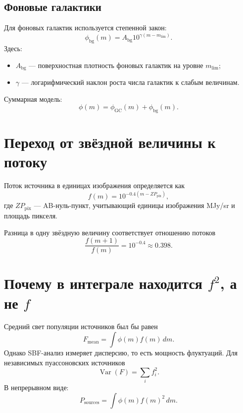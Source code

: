 \documentclass[12pt,a4paper]{article}
\newcommand{\Phigc}{\phi_{\mathrm{GC}}}
\newcommand{\Phibg}{\phi_{\mathrm{bg}}}
\begin{document}
\subsection{Фоновые галактики}

Для фоновых галактик используется степенной закон:
\begin{equation}
    \Phibg(m)=
    A_{\mathrm{bg}}
    10^{\gamma(m-m_{\mathrm{lim}})}.
\end{equation}
Здесь:
\begin{itemize}
    \item \(A_{\mathrm{bg}}\) --- поверхностная плотность
    фоновых галактик на уровне \(m_{\mathrm{lim}}\);
    \item \(\gamma\) --- логарифмический наклон роста числа
    галактик к слабым величинам.
\end{itemize}

Суммарная модель:
\begin{equation}
    \phi(m)=\Phigc(m)+\Phibg(m).
\end{equation}

\section{Переход от звёздной величины к потоку}

Поток источника в единицах изображения определяется как
\begin{equation}
    f(m)=10^{-0.4(m-ZP_{\mathrm{pix}})},
\end{equation}
где \(ZP_{\mathrm{pix}}\) --- AB-нуль-пункт, учитывающий
единицы изображения MJy/sr и площадь пикселя.

Разница в одну звёздную величину соответствует отношению
потоков
\begin{equation}
    \frac{f(m+1)}{f(m)}
    =10^{-0.4}
    \approx0.398.
\end{equation}

\section{Почему в интеграле находится \(f^2\), а не \(f\)}

Средний свет популяции источников был бы равен
\begin{equation}
    F_{\mathrm{mean}}
    =
    \int\phi(m)f(m)\,dm.
\end{equation}
Однако SBF-анализ измеряет дисперсию, то есть мощность
флуктуаций. Для независимых пуассоновских источников
\begin{equation}
    \operatorname{Var}(F)
    =
    \sum_i f_i^2.
\end{equation}
В непрерывном виде:
\begin{equation}
    P_{\mathrm{sources}}
    =
    \int\phi(m)f(m)^2\,dm.
\end{equation}
\end{document}
